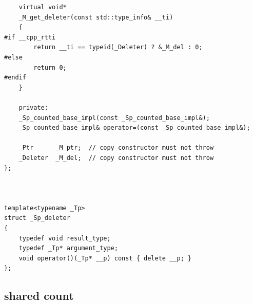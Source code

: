 \documentclass[UTF8,a4paper,12pt]{ctexbook}
\begin{document}
\begin{lstlisting}
	virtual void*
	_M_get_deleter(const std::type_info& __ti)
	{
#if __cpp_rtti
		return __ti == typeid(_Deleter) ? &_M_del : 0;
#else
		return 0;
#endif
	}
	
	private:
	_Sp_counted_base_impl(const _Sp_counted_base_impl&);
	_Sp_counted_base_impl& operator=(const _Sp_counted_base_impl&);
	
	_Ptr      _M_ptr;  // copy constructor must not throw
	_Deleter  _M_del;  // copy constructor must not throw
};
	

	
template<typename _Tp>
struct _Sp_deleter
{
	typedef void result_type;
	typedef _Tp* argument_type;
	void operator()(_Tp* __p) const { delete __p; }
};		
		\end{lstlisting}

	\subsection{shared count}
\end{document}
